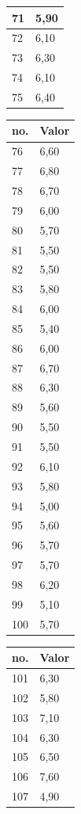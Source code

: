 \begin{table}[!ht]
\begin{tabular}{ |l|l| }
71	&	5,90	\\ \hline
72	&	6,10	\\ \hline
73	&	6,30	\\ \hline
74	&	6,10	\\ \hline
75	&	6,40	\\ \hline
\end{tabular}
\begin{tabular}{ |l|l| }
\hline
 no. & Valor \\ \hline
76	&	6,60	\\ \hline
77	&	6,80	\\ \hline
78	&	6,70	\\ \hline
79	&	6,00	\\ \hline
80	&	5,70	\\ \hline
81	&	5,50	\\ \hline
82	&	5,50	\\ \hline
83	&	5,80	\\ \hline
84	&	6,00	\\ \hline
85	&	5,40	\\ \hline
86	&	6,00	\\ \hline
87	&	6,70	\\ \hline
88	&	6,30	\\ \hline
89	&	5,60	\\ \hline
90	&	5,50	\\ \hline
91	&	5,50	\\ \hline
92	&	6,10	\\ \hline
93	&	5,80	\\ \hline
94	&	5,00	\\ \hline
95	&	5,60	\\ \hline
96	&	5,70	\\ \hline
97	&	5,70	\\ \hline
98	&	6,20	\\ \hline
99	&	5,10	\\ \hline
100	&	5,70	\\ \hline
\end{tabular}
\begin{tabular}{ |l|l| }
\hline
 no. & Valor \\ \hline
101	&	6,30	\\ \hline
102	&	5,80	\\ \hline
103	&	7,10	\\ \hline
104	&	6,30	\\ \hline
105	&	6,50	\\ \hline
106	&	7,60	\\ \hline
107	&	4,90	\\ \hline

\end{tabular}
\end{table}
